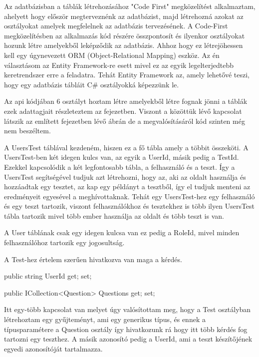 




Az adatbázisban a táblák létrehozásához "Code First" megközelítést alkalmaztam, ahelyett hogy először megterveznénk az adatbázist, majd létrehozná azokat az osztályokat amelyek megfelelnek az adatbázis tervezésének. A Code-First megközelítésben az alkalmazás kód részére összpontosít és ilyenkor osztályokat hozunk létre amelyekből leképződik az adatbázis. Ahhoz hogy ez létrejöhessen kell egy úgynevezett ORM (Object-Relational Mapping) eszköz. Az én választásom az Entity Framework-re esett mivel ez az egyik legelterjedtebb keretrendszer erre a feladatra. Tehát Entity Framework az, amely lehetővé teszi, hogy egy adatbázis tábláit C\# osztályokká képezzünk le. \newline

Az api kódjában 6 osztályt hoztam létre amelyekből létre fognak jönni a táblák ezek adattagjait részleteztem az  fejezetben.
Viszont a közöttük lévő kapcsolat látszik az említett fejezetben lévő ábrán de a megvalósításáról kód szinten még nem beszéltem. \newline

A UsersTest táblával kezdeném, hiszen ez a fő tábla amely a többit összeköti.
A UsersTest-ben két idegen kulcs van, az egyik a UserId, másik pedig a TestId. Ezekkel kapcsolódik a két legfontosabb tábla, a felhasználó és a teszt. Így a UsersTest segítségével tudjuk azt létrehozni, hogy az, aki az oldalt használja és hozzáadtak egy tesztet, az kap egy példányt a tesztből, így el tudjuk menteni az eredményeit egyesével a meghívottaknak.
Tehát egy UsersTest-hez egy felhasználó és egy teszt tartozik, viszont felhasználókhoz és tesztekhez is több ilyen UsersTest tábla tartozik mivel több ember használja az oldalt és több teszt is van. \newline


A User táblának csak egy idegen kulcsa van ez pedig a RoleId, mivel minden felhasználóhoz tartozik egy jogosultság.\newline


A Test-hez értelem szerűen hivatkozva van maga a kérdés.
\begin{cpp}
    public string UserId { get; set; }

    public ICollection<Question> Questions { get; set; }
\end{cpp}
Itt egy-több kapcsolat van melyet úgy valósítottam meg, hogy a Test osztályban létrehoztam egy gyűjteményt, ami egy generikus típus, és ennek a típusparamétere a Question osztály így hivatkozunk rá hogy itt több kérdés fog tartozni egy teszthez. A másik azonosító pedig a UserId, ami a teszt készítőjének egyedi azonosítóját tartalmazza. \newline

